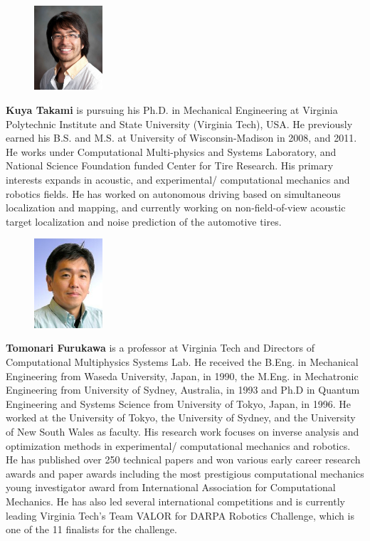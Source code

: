 \begin{figure}[H]
  \centering
    \includegraphics[width=1in,clip,keepaspectratio]{takami.jpg}
\end{figure}
\noindent\textbf{Kuya Takami} is pursuing his Ph.D. in Mechanical Engineering at Virginia Polytechnic Institute and State University (Virginia Tech), USA. He previously earned his B.S. and M.S. at University of Wisconsin-Madison in 2008, and 2011. He works under Computational Multi-physics and Systems Laboratory, and National Science Foundation funded Center for Tire Research. His primary interests expands in acoustic, and experimental/ computational mechanics and robotics fields. He has worked on autonomous driving based on simultaneous localization and mapping, and currently working on non-field-of-view acoustic target localization and noise prediction of the automotive tires.
\begin{figure}[H]
  \centering
 \includegraphics[width=1in,clip,keepaspectratio]{furukawa.jpg}
\end{figure}
\noindent\textbf{Tomonari Furukawa} is a professor at Virginia Tech and Directors of Computational Multiphysics Systems Lab. He received the B.Eng. in Mechanical Engineering from Waseda University, Japan, in 1990, the M.Eng. in Mechatronic Engineering from University of Sydney, Australia, in 1993 and Ph.D in Quantum Engineering and Systems Science from University of Tokyo, Japan, in 1996.  He worked at the University of Tokyo, the University of Sydney, and the University of New South Wales as faculty. His research work focuses on inverse analysis and optimization methods in experimental/ computational mechanics and robotics.  He has published over 250 technical papers and won various early career research awards and paper awards including the most prestigious computational mechanics young investigator award from International Association for Computational Mechanics.  He has also led several international competitions and is currently leading Virginia Tech’s Team VALOR for DARPA Robotics Challenge, which is one of the 11 finalists for the challenge. 
